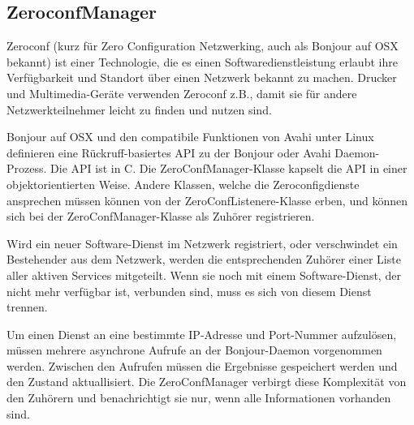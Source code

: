 \subsection{ZeroconfManager}

Zeroconf (kurz für Zero Configuration Netzwerking, auch als Bonjour auf OSX bekannt) ist einer Technologie, die es einen Softwaredienstleistung erlaubt ihre Verfügbarkeit und Standort über einen Netzwerk bekannt zu machen. Drucker und Multimedia-Geräte verwenden Zeroconf z.B., damit sie für andere Netzwerkteilnehmer leicht zu finden und nutzen sind.

Bonjour auf OSX und den compatibile Funktionen von Avahi unter Linux definieren eine Rückruff-basiertes API zu der Bonjour oder Avahi Daemon-Prozess. Die API ist in C. Die ZeroConfManager-Klasse kapselt die API in einer objektorientierten Weise. Andere Klassen, welche die Zeroconfigdienste ansprechen müssen können von der ZeroConfListenere-Klasse erben, und können sich bei der ZeroConfManager-Klasse als Zuhörer registrieren.

Wird ein neuer Software-Dienst im Netzwerk registriert, oder verschwindet ein Bestehender aus dem Netzwerk, werden die entsprechenden Zuhörer einer Liste aller aktiven Services mitgeteilt. Wenn sie noch mit einem Software-Dienst, der nicht mehr verfügbar ist, verbunden sind, muss es sich von diesem Dienst trennen.

Um einen Dienst an eine bestimmte IP-Adresse und Port-Nummer aufzulösen, müssen mehrere asynchrone Aufrufe an der Bonjour-Daemon vorgenommen werden. Zwischen den Aufrufen müssen die Ergebnisse gespeichert werden und den Zustand aktuallisiert. Die ZeroConfManager verbirgt diese Komplexität von den Zuhörern und benachrichtigt sie nur, wenn alle Informationen vorhanden sind.